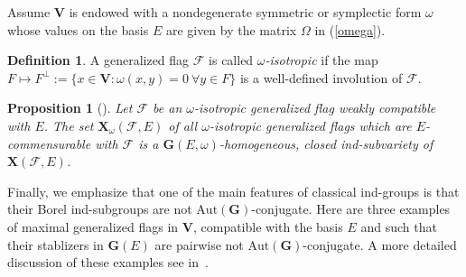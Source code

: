\documentclass{amsart}
\newtheorem{proposition}{Proposition}
\theoremstyle{definition}
\newtheorem{definition}{Definition}
\newtheorem{notation}{Notation}
\newcommand{\NN}{\mathbb{N}^*}
\begin{document}
Assume $\mathbf{V}$ is endowed with a nondegenerate symmetric or symplectic form $\omega$ whose values on the basis $E$ are given by the matrix $\Omega$ in (\ref{omega}).

%

\begin{definition}
A generalized flag $\mathcal{F}$ is called {\em $\omega$-isotropic} if 
the map $F\mapsto F^\perp:=\{x\in\mathbf{V}:\omega(x,y)=0\ \forall y\in F\}$ 
is a well-defined involution of $\mathcal{F}$.
\end{definition}

\begin{proposition}[\cite{Dimitrov-Penkov}]
\label{P2.3-3}
Let $\mathcal{F}$ be an $\omega$-isotropic generalized flag weakly compatible with $E$.
The set $\mathbf{X}_\omega(\mathcal{F},E)$ of all
$\omega$-isotropic generalized flags which are $E$-commensurable with $\mathcal{F}$
is a $\mathbf{G}(E,\omega)$-homogeneous, closed ind-subvariety of $\mathbf{X}(\mathcal{F},E)$.
\end{proposition}

Finally, we emphasize that one of the main features of classical ind-groups is that their Borel ind-subgroups are not $\mathrm{Aut}(\mathbf{G})$-conjugate.  Here are three examples of maximal generalized flags in $\mathbf{V}$, compatible with the basis $E$ and such that their stablizers in $\mathbf{G}(E)$ are pairwise not $\mathrm{Aut}(\mathbf{G})$-conjugate.
A more detailed discussion of these examples see in~\cite{Dimitrov-Penkov}.
\end{document}
